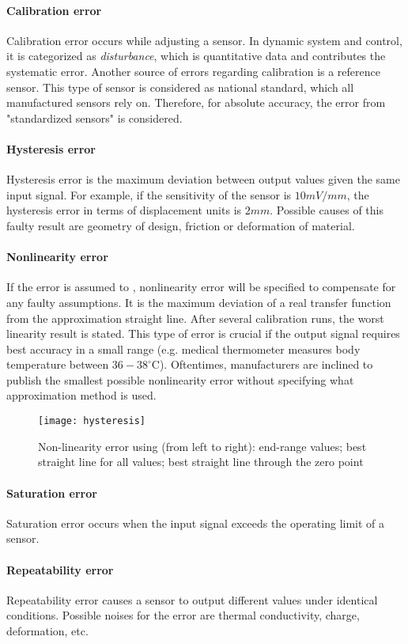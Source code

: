 \paragraph{Calibration error}
Calibration error occurs while adjusting a sensor. In dynamic system and control, it is categorized as \textit{disturbance}, which is quantitative data and contributes the systematic error. Another source of errors regarding calibration is a reference sensor. This type of sensor is considered as national standard, which all manufactured sensors rely on. Therefore, for absolute accuracy, the error from "standardized sensors" is considered.
\paragraph{Hysteresis error}
Hysteresis error is the maximum deviation between output values given the same input signal. For example, if the sensitivity of the sensor is $ 10\unit{mV/mm} $, the hysteresis error in terms of displacement units is $ 2\unit{mm} $. Possible causes of this faulty result are geometry of design, friction or deformation of material.
\paragraph{Nonlinearity error}
If the error is assumed to , nonlinearity error will be specified to compensate for any faulty assumptions. It is the maximum deviation of a real transfer function from the approximation straight line. After several calibration runs, the worst linearity result is stated. This type of error is crucial if the output signal requires best accuracy in a small range (e.g. medical thermometer measures body temperature between $ 36-38^\circ\text{C} $). Oftentimes, manufacturers are inclined to publish the smallest possible nonlinearity error without specifying what approximation method is used.
\begin{figure}
	\centering
	\texttt{[image: hysteresis]}
	\caption{Non-linearity error using (from left to right): end-range values; best straight line for all values; best straight line through the zero point \cite{bolton2015mechatronics}}
\end{figure}
\paragraph{Saturation error}
Saturation error occurs when the input signal exceeds the operating limit of a sensor.
\paragraph{Repeatability error}
Repeatability error causes a sensor to output different values under identical conditions. Possible noises for the error are thermal conductivity, charge, deformation, etc.
